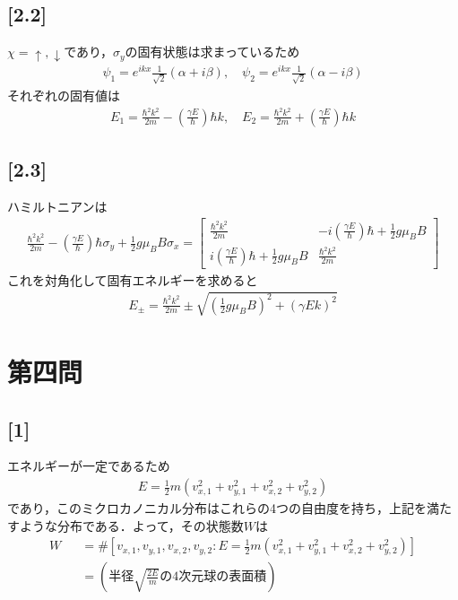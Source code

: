 \documentclass[12pt,dvipdfmx]{jsarticle}
\begin{document}
\subsection*{\large{[2.2]}}
$\chi = \uparrow,\downarrow$であり，$\sigma_y$の固有状態は求まっているため
\begin{eqnarray}
  \psi_1 = e^{ikx}\frac{1}{\sqrt{2}}(\alpha +i \beta), \quad \psi_2 = e^{ikx}\frac{1}{\sqrt{2}}(\alpha -i \beta)
\end{eqnarray}
それぞれの固有値は
\begin{eqnarray}
  E_1= \frac{\hbar^2k^2}{2m} - \left(  \frac{\gamma E}{\hbar}\right)\hbar k , \quad E_2 = \frac{\hbar^2k^2}{2m} + \left(  \frac{\gamma E}{\hbar}\right)\hbar k 
\end{eqnarray}
\subsection*{\large{[2.3]}}
ハミルトニアンは
\begin{eqnarray}
  \frac{\hbar^2 k^2}{2m} - \left(  \frac{\gamma E}{\hbar}\right)\hbar\sigma_y + \frac{1}{2}g\mu_B B\sigma_x=
  \begin{bmatrix}
    \frac{\hbar^2 k^2}{2m} & - i\left(  \frac{\gamma E}{\hbar}\right)\hbar + \frac{1}{2}g\mu_B B\\
     i\left(  \frac{\gamma E}{\hbar}\right)\hbar + \frac{1}{2}g\mu_B B & \frac{\hbar^2 k^2}{2m}
  \end{bmatrix}
\end{eqnarray}
これを対角化して固有エネルギーを求めると
\begin{eqnarray}
  E_{\pm} = \frac{\hbar^2 k^2 }{2m} \pm \sqrt{\left(\frac{1}{2}g\mu_B B\right)^2 + \left(\gamma Ek \right)^2 }
\end{eqnarray}

\newpage

\section*{\Large{第四問}}
\subsection*{\large{[1]}}
エネルギーが一定であるため
\begin{eqnarray}
  E = \frac{1}{2}m\left( v_{x,1}^2 + v_{y,1}^2 + v_{x,2}^2 + v_{y,2}^2 \right)
\end{eqnarray}
であり，このミクロカノニカル分布はこれらの4つの自由度を持ち，上記を満たすような分布である．よって，その状態数$W$は
\begin{eqnarray}
  W &&= \# \left[ v_{x,1},v_{y,1},v_{x,2},v_{y,2} : E = \frac{1}{2}m\left( v_{x,1}^2 + v_{y,1}^2 + v_{x,2}^2 + v_{y,2}^2 \right) \right]\\
  &&=\left( 半径 \sqrt{\frac{2E}{m}}の4次元球の表面積 \right)
\end{eqnarray}
\end{document}
